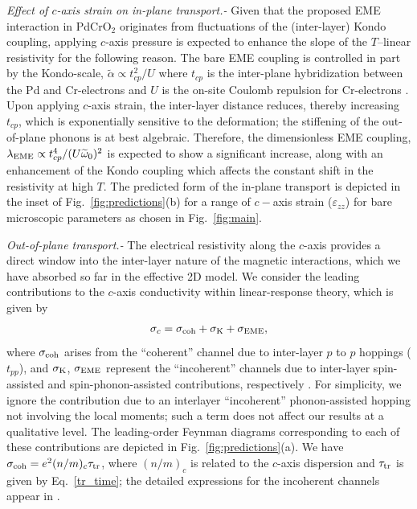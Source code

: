 \documentclass[aps,prl,twocolumn,superscriptaddress,amsmath,nofootinbib,10pt,floatfix]{revtex4-2}
\begin{document}
\textit{Effect of $c$-axis strain on in-plane transport.-} Given that the proposed EME interaction in PdCrO$_2$ originates from fluctuations of the (inter-layer) Kondo coupling, applying $c$-axis pressure is expected to enhance the slope of the $T$--linear resistivity for the following reason. The bare EME coupling is controlled in part by the Kondo-scale, $\widetilde{\alpha}\propto t_{cp}^2/U$ where $t_{cp}$ is the inter-plane hybridization between the Pd and Cr-electrons and $U$ is the on-site Coulomb repulsion for Cr-electrons \cite{sunko_probing_2020,Supplementary_material}. Upon applying $c$-axis strain, the inter-layer distance reduces, thereby increasing $t_{cp}$, which is exponentially sensitive to the deformation; the stiffening of the out-of-plane phonons is at best algebraic. Therefore, the dimensionless EME coupling, $\lambda_{\rm EME}\propto t^4_{cp}/(U\widetilde{\omega}_0)^2$ is expected to show a significant increase, along with an enhancement of the Kondo coupling which affects the constant shift in the resistivity at high $T$. The predicted form of the in-plane transport is depicted in the inset of Fig.~\ref{fig:predictions}(b) for a range of $c-$axis strain ($\varepsilon_{zz}$) for bare microscopic parameters as chosen in Fig.~\ref{fig:main}. 


\textit{Out-of-plane transport.-} The electrical resistivity along the $c$-axis provides a direct window into the inter-layer nature of the magnetic interactions, which we have absorbed so far in the effective 2D model. We consider the leading contributions to the $c$-axis conductivity within linear-response theory, which is given by 
\begin{eqnarray}
\sigma_c = \sigma_{\rm coh} + \sigma_{\rm K} + \sigma_{\rm EME},
\label{c_axis_cond_terms}
\end{eqnarray}
where $\sigma_{\rm coh}$ arises from the ``coherent'' channel due to inter-layer $p$ to $p$ hoppings ($t_{pp}$), and $\sigma_{\rm K}$, $\sigma_{\rm EME}$ represent the ``incoherent'' channels due to inter-layer spin-assisted and spin-phonon-assisted contributions, respectively \cite{Supplementary_material}. For simplicity, we ignore the contribution due to an interlayer ``incoherent'' phonon-assisted hopping not involving the local moments; such a term does not affect our results at a qualitative level. The leading-order Feynman diagrams corresponding to each of these contributions  are depicted in Fig.~\ref{fig:predictions}(a). We have $\sigma_{\rm coh} = e^2 (n/m)_c \tau_{\rm tr}$, where $(n/m)_c$ is related to the $c$-axis dispersion and $\tau_{\rm tr}$ is given by Eq.~\eqref{tr_time}; the detailed expressions for the incoherent channels appear in \cite{Supplementary_material}. 
\end{document}
